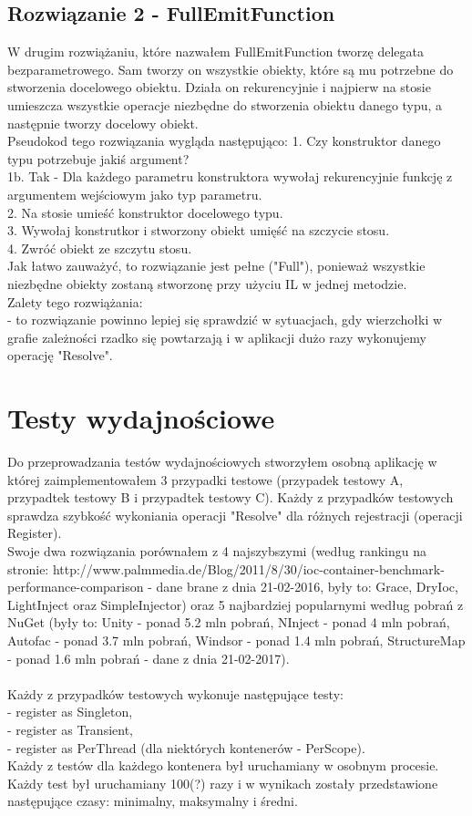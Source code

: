 \documentclass[12pt]{article}
\begin{document}
\subsection{Rozwiązanie 2 - FullEmitFunction}
W drugim rozwiążaniu, które nazwałem FullEmitFunction tworzę delegata bezparametrowego. Sam tworzy on wszystkie obiekty, które są mu potrzebne do stworzenia docelowego obiektu. Działa on rekurencyjnie i najpierw na stosie umieszcza wszystkie operacje niezbędne do stworzenia obiektu danego typu, a następnie tworzy docelowy obiekt.\\
Pseudokod tego rozwiązania wygląda następująco:
1. Czy konstruktor danego typu potrzebuje jakiś argument?\\
1b. Tak - Dla każdego parametru konstruktora wywołaj rekurencyjnie funkcję z argumentem wejściowym jako typ parametru.\\
2. Na stosie umieść konstruktor docelowego typu.\\
3. Wywołaj konstrutkor i stworzony obiekt umięść na szczycie stosu.\\
4. Zwróć obiekt ze szczytu stosu.\\
Jak łatwo zauważyć, to rozwiązanie jest pełne ("Full"), ponieważ wszystkie niezbędne obiekty zostaną stworzonę przy użyciu IL w jednej metodzie.\\
Zalety tego rozwiążania:\\
- to rozwiązanie powinno lepiej się sprawdzić w sytuacjach, gdy wierzchołki w grafie zależności rzadko się powtarzają i w aplikacji dużo razy wykonujemy operację "Resolve".



\section{Testy wydajnościowe}
Do przeprowadzania testów wydajnościowych stworzyłem osobną aplikację w której zaimplementowałem 3 przypadki testowe (przypadek testowy A, przypadtek testowy B i przypadtek testowy C). Każdy z przypadków testowych sprawdza szybkość wykoniania operacji "Resolve" dla różnych rejestracji (operacji Register).\\
Swoje dwa rozwiązania porównałem z 4 najszybszymi (według rankingu na stronie: http://www.palmmedia.de/Blog/2011/8/30/ioc-container-benchmark-performance-comparison - dane brane z dnia 21-02-2016, były to: Grace, DryIoc, LightInject oraz SimpleInjector) oraz 5 najbardziej popularnymi według pobrań z NuGet (były to: Unity - ponad 5.2 mln pobrań, NInject - ponad 4 mln pobrań, Autofac - ponad 3.7 mln pobrań, Windsor - ponad 1.4 mln pobrań, StructureMap - ponad 1.6 mln pobrań - dane z dnia 21-02-2017).\\
\\
Każdy z przypadków testowych wykonuje następujące testy:\\
- register as Singleton,\\
- register as Transient,\\
- register as PerThread (dla niektórych kontenerów - PerScope).\\
Każdy z testów dla każdego kontenera był uruchamiany w osobnym procesie. Każdy test był uruchamiany 100(?) razy i w wynikach zostały przedstawione następujące czasy: minimalny,  maksymalny i średni.
\end{document}
